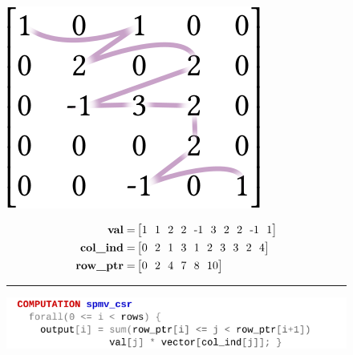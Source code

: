 \begin{figure}[t]
\begin{minipage}[b]{0.3\linewidth}
\includegraphics[width=0.9\linewidth]{figures/csrorder.png}
\vspace{0.04em}
\end{minipage}
\begin{minipage}[b]{0.65\linewidth}
\begin{align*}
\text{\bf val} =& \begin{bmatrix}
1\ \ 1\ \ 2\ \ 2\ \ \text{-}1\ \ 3\ \ 2\ \ 2\ \ \text{-}1\ \ 1\\
\end{bmatrix}\\
\text{\bf col\_ind} =& \begin{bmatrix}
0\ \ 2\ \ 1\ \ 3\ \ 1\ \ 2\ \ 3\ \ 3\ \ 2\ \ 4\\
\end{bmatrix}\\
\text{\bf row\_ptr} =& \begin{bmatrix}
0\ \ 2\ \ 4\ \ 7\ \ 8\ \ 10\\
\end{bmatrix}
\end{align*}
\end{minipage}
\vspace{0.5em}
\hrule
\vspace{0.3em}
\includegraphics[width=\linewidth]{figures/spmvcsrwhat.pdf}

\end{figure}

